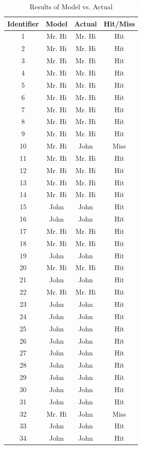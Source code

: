 \documentclass{article}
\begin{document}
\begin{table}[!h]
\centering

\begin{tabular}{c c c c}
\hline
Identifier & Model &  Actual & Hit/Miss \\
\hline
\hline
1 & Mr. Hi & Mr. Hi & Hit \\
2 & Mr. Hi & Mr. Hi & Hit \\
3 & Mr. Hi & Mr. Hi & Hit \\
4 & Mr. Hi & Mr. Hi & Hit \\
5 & Mr. Hi & Mr. Hi & Hit \\
6 & Mr. Hi & Mr. Hi & Hit \\
7 & Mr. Hi & Mr. Hi & Hit \\
8 & Mr. Hi & Mr. Hi & Hit \\
9 & Mr. Hi & Mr. Hi & Hit \\
10 & Mr. Hi & John & Miss \\
11 & Mr. Hi & Mr. Hi & Hit \\
12 & Mr. Hi & Mr. Hi & Hit \\
13 & Mr. Hi & Mr. Hi & Hit \\
14 & Mr. Hi & Mr. Hi & Hit \\
15 & John & John & Hit \\
16 & John & John & Hit \\
17 & Mr. Hi & Mr. Hi & Hit \\
18 & Mr. Hi & Mr. Hi & Hit \\
19 & John & John & Hit \\
20 & Mr. Hi & Mr. Hi & Hit \\
21 & John & John & Hit \\
22 & Mr. Hi & Mr. Hi & Hit \\
23 & John & John & Hit \\
24 & John & John & Hit \\
25 & John & John & Hit \\
26 & John & John & Hit \\
27 & John & John & Hit \\
28 & John & John & Hit \\
29 & John & John & Hit \\
30 & John & John & Hit \\
31 & John & John & Hit \\
32 & Mr. Hi & John & Miss \\
33 & John & John & Hit \\
34 & John & John & Hit \\
\hline
\end{tabular}
\caption{Results of Model vs. Actual}
\label{hitsmisses}
\end{table}
\end{document}
